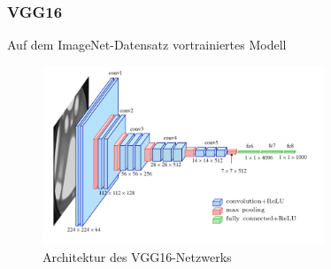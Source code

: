 \begin{frame}
    \frametitle{VGG16 \cite{DBLP:journals/corr/SimonyanZ14a}}

    Auf dem ImageNet-Datensatz \cite{5206848} vortrainiertes Modell
    \begin{figure}[H]
        \centering
        \includegraphics[width=0.75\textwidth]{resources/content/vgg16.png}
        \caption{Architektur des VGG16-Netzwerks \cite{vgg16_img}}
        \label{img:vgg16_img}
    \end{figure}

\end{frame}